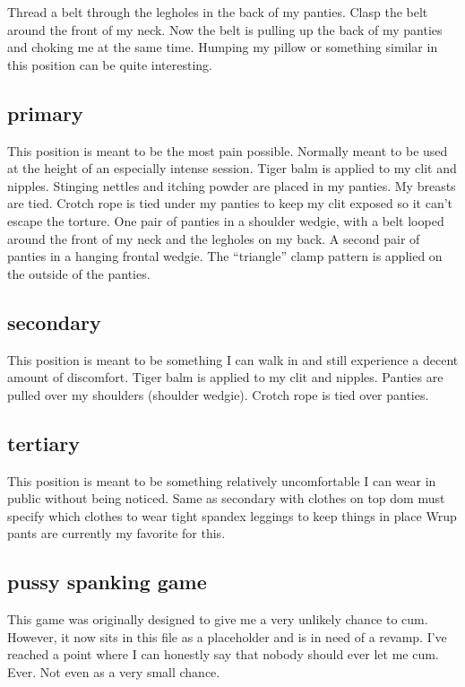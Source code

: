 \documentclass{article}
\begin{document}
Thread a belt through the legholes in the back of my panties.
Clasp the belt around the front of my neck.
Now the belt is pulling up the back of my panties and choking me at the same time.
Humping my pillow or something similar in this position can be quite interesting.

\subsection{primary}

This position is meant to be the most pain possible.
Normally meant to be used at the height of an especially intense session.
Tiger balm is applied to my clit and nipples.
Stinging nettles and itching powder are placed in my panties.
My breasts are tied.
Crotch rope is tied under my panties to keep my clit exposed so it can't escape the torture.
One pair of panties in a shoulder wedgie, with a belt looped around the front of my neck and the legholes on my back.
A second pair of panties in a hanging frontal wedgie.
The ``triangle'' clamp pattern is applied on the outside of the panties.

\subsection{secondary}

This position is meant to be something I can walk in and still experience a decent amount of discomfort.
Tiger balm is applied to my clit and nipples.
Panties are pulled over my shoulders (shoulder wedgie).
Crotch rope is tied over panties.

\subsection{tertiary}

This position is meant to be something relatively uncomfortable I can wear in public without being noticed.
Same as secondary with clothes on top
dom must specify which clothes to wear
tight spandex leggings to keep things in place
Wrup pants are currently my favorite for this.

\subsection{pussy spanking game}

This game was originally designed to give me a very unlikely chance to cum.
However, it now sits in this file as a placeholder and is in need of a revamp.
I've reached a point where I can honestly say that nobody should ever let me cum.
Ever.
Not even as a very small chance.
\end{document}
